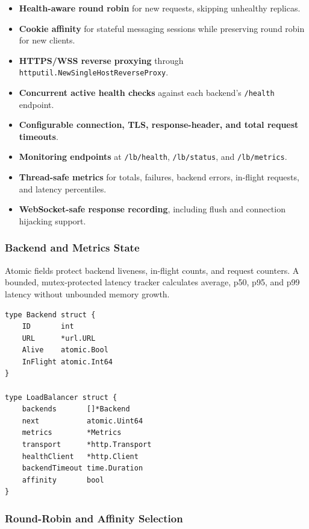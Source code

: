\documentclass[12pt,a4paper]{article}
\begin{document}
\begin{itemize}[leftmargin=2em]
    \item \textbf{Health-aware round robin} for new requests, skipping unhealthy replicas.
    \item \textbf{Cookie affinity} for stateful messaging sessions while preserving round robin for new clients.
    \item \textbf{HTTPS/WSS reverse proxying} through \texttt{httputil.NewSingleHostReverseProxy}.
    \item \textbf{Concurrent active health checks} against each backend's \texttt{/health} endpoint.
    \item \textbf{Configurable connection, TLS, response-header, and total request timeouts}.
    \item \textbf{Monitoring endpoints} at \texttt{/lb/health}, \texttt{/lb/status}, and \texttt{/lb/metrics}.
    \item \textbf{Thread-safe metrics} for totals, failures, backend errors, in-flight requests, and latency percentiles.
    \item \textbf{WebSocket-safe response recording}, including flush and connection hijacking support.
\end{itemize}

\subsubsection{Backend and Metrics State}

Atomic fields protect backend liveness, in-flight counts, and request counters. A bounded, mutex-protected latency tracker calculates average, p50, p95, and p99 latency without unbounded memory growth.

\begin{lstlisting}[style=gostyle, caption={Core backend and load-balancer state}]
type Backend struct {
    ID       int
    URL      *url.URL
    Alive    atomic.Bool
    InFlight atomic.Int64
}

type LoadBalancer struct {
    backends       []*Backend
    next           atomic.Uint64
    metrics        *Metrics
    transport      *http.Transport
    healthClient   *http.Client
    backendTimeout time.Duration
    affinity       bool
}
\end{lstlisting}

\subsubsection{Round-Robin and Affinity Selection}
\end{document}
